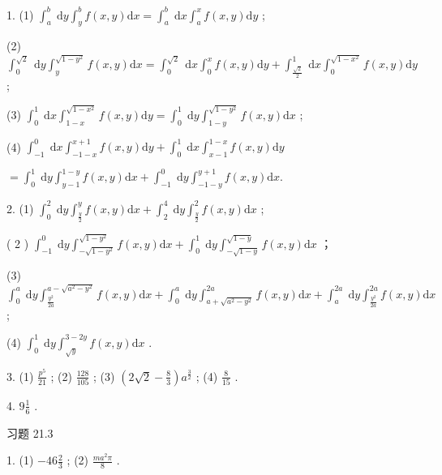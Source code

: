 1. (1) \({\int }_{a}^{b}\mathrm{\;d}y{\int }_{y}^{b}f\left( {x,y}\right) \mathrm{d}x = {\int }_{a}^{b}\mathrm{\;d}x{\int }_{a}^{x}f\left( {x,y}\right) \mathrm{d}y\) ;

(2) \({\int }_{0}^{\sqrt{2}}\mathrm{\;d}y{\int }_{y}^{\sqrt{1 - {y}^{2}}}f\left( {x,y}\right) \mathrm{d}x = {\int }_{0}^{\sqrt{2}}\mathrm{\;d}x{\int }_{0}^{x}f\left( {x,y}\right) \mathrm{d}y + {\int }_{\frac{\sqrt{2}}{2}}^{1}\mathrm{\;d}x{\int }_{0}^{\sqrt{1 - {x}^{2}}}f\left( {x,y}\right) \mathrm{d}y\) ;

(3) \({\int }_{0}^{1}\mathrm{\;d}x{\int }_{1 - x}^{\sqrt{1 - {x}^{2}}}f\left( {x,y}\right) \mathrm{d}y = {\int }_{0}^{1}\mathrm{\;d}y{\int }_{1 - y}^{\sqrt{1 - {y}^{2}}}f\left( {x,y}\right) \mathrm{d}x\) ;

(4) \({\int }_{-1}^{0}\mathrm{\;d}x{\int }_{-1 - x}^{x + 1}f\left( {x,y}\right) \mathrm{d}y + {\int }_{0}^{1}\mathrm{\;d}x{\int }_{x - 1}^{1 - x}f\left( {x,y}\right) \mathrm{d}y\)

\(= {\int }_{0}^{1}\mathrm{\;d}y{\int }_{y - 1}^{1 - y}f\left( {x,y}\right) \mathrm{d}x + {\int }_{-1}^{0}\mathrm{\;d}y{\int }_{-1 - y}^{y + 1}f\left( {x,y}\right) \mathrm{d}x.\)

2. (1) \({\int }_{0}^{2}\mathrm{\;d}y{\int }_{\frac{y}{2}}^{y}f\left( {x,y}\right) \mathrm{d}x + {\int }_{2}^{4}\mathrm{\;d}y{\int }_{\frac{y}{2}}^{2}f\left( {x,y}\right) \mathrm{d}x\) ;

( 2 ) \({\int }_{-1}^{0}\mathrm{\;d}y{\int }_{-\sqrt{1 - {y}^{2}}}^{\sqrt{1 - {y}^{2}}}f\left( {x,y}\right) \mathrm{d}x + {\int }_{0}^{1}\mathrm{\;d}y{\int }_{-\sqrt{1 - y}}^{\sqrt{1 - y}}f\left( {x,y}\right) \mathrm{d}x\) ；

(3) \({\int }_{0}^{a}\mathrm{\;d}y{\int }_{\frac{{y}^{2}}{2a}}^{a - \sqrt{{a}^{2} - {y}^{2}}}f\left( {x,y}\right) \mathrm{d}x + {\int }_{0}^{a}\mathrm{\;d}y{\int }_{a + \sqrt{{a}^{2} - {y}^{2}}}^{2a}f\left( {x,y}\right) \mathrm{d}x + {\int }_{a}^{2a}\mathrm{\;d}y{\int }_{\frac{{y}^{2}}{2a}}^{2a}f\left( {x,y}\right) \mathrm{d}x\) ;

(4) \({\int }_{0}^{1}\mathrm{\;d}y{\int }_{\sqrt{y}}^{3 - {2y}}f\left( {x,y}\right) \mathrm{d}x\) .

3. (1) \(\frac{{p}^{5}}{21}\) ; (2) \(\frac{128}{105}\) ; (3) \(\left( {2\sqrt{2} - \frac{8}{3}}\right) {a}^{\frac{3}{2}}\) ; (4) \(\frac{8}{15}\) .

4. \(9\frac{1}{6}\) .

习题 21.3

1. (1) \(- {46}\frac{2}{3}\) ; (2) \(\frac{m{a}^{2}\pi }{8}\) .

